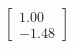 \documentclass[preview]{standalone}
\begin{document}
\begin{align*}
\begin{bmatrix} 1.00 \\ -1.48 \end{bmatrix}
\end{align*}
\end{document}
